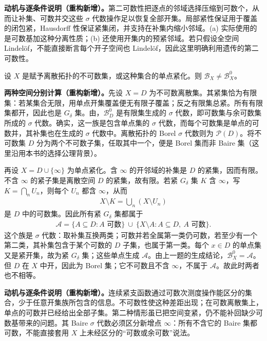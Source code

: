 \documentclass[../../main.tex]{subfiles}
\begin{document}
\begin{remark}
\textbf{动机与逐条件说明（重构新增）。}第二可数性把逐点的邻域选择压缩到可数个，从而让补集、可数并交这些 $\sigma$ 代数操作足以恢复全部开集。局部紧性保证用于覆盖的闭包紧，Hausdorff 性保证紧集闭，并支持在补集内缩小邻域。(a) 实际使用的是可数基加这种分离性质；(b) 还使用开集内的预紧邻域。若只假设全空间 Lindelöf，不能直接断言每个开子空间也 Lindelöf，因此这里明确利用遗传的第二可数性。
\end{remark}

\begin{exercise}\label{exercise:ch07-baire-borel-different}
设 $X$ 是赋予离散拓扑的不可数集，或这种集合的单点紧化。则 $\mathscr B_X\ne\mathscr B_X^0$。
\end{exercise}
\begin{solution}
\textbf{两种空间分别计算（重构新增）。}先设 $X=D$ 为不可数离散集。其紧集恰为有限集：若某集合无限，用单点开集覆盖便无有限子覆盖；反之有限集总紧。所有有限集都开，因此也是 $G_\delta$ 集。由，$\mathscr B_D^0$ 是有限集生成的 $\sigma$ 代数，即可数集与余可数集所成的 $\sigma$ 代数。确实，这一族是包含单点集的 $\sigma$ 代数，而每个可数集是单点的可数并，其补集也在生成的 $\sigma$ 代数中。离散拓扑的 Borel $\sigma$ 代数则为 $\mathscr P(D)$。将不可数集 $D$ 分为两个不可数子集，任取其中一个，便是 Borel 集而非 Baire 集（这里沿用本书的选择公理背景）。

再设 $X=D\cup\{\infty\}$ 为单点紧化。含 $\infty$ 的开邻域的补集是 $D$ 的紧集，因而有限。不含 $\infty$ 的紧子集是离散空间 $D$ 的紧集，故有限。若紧 $G_\delta$ 集 $K$ 含 $\infty$，写 $K=\bigcap_n U_n$，则每个 $U_n$ 都含 $\infty$，从而
\begin{align*}
X\setminus K=\bigcup_n(X\setminus U_n)
\end{align*}
是 $D$ 中的可数集。因此所有紧 $G_\delta$ 集都属于
\begin{align*}
\mathscr A=\{A\subseteq D:A\text{ 可数}\}
\ \cup\ \{X\setminus A:A\subseteq D,\ A\text{ 可数}\}.
\end{align*}
这个族是 $\sigma$ 代数：取补集互换两类；可数并若全属第一类仍可数，若至少有一个第二类，其补集包含于某个可数的 $D$ 子集，也属于第一类。每个 $x\in D$ 的单点集又是紧开集，故为紧 $G_\delta$ 集；这些单点生成 $\mathscr A$。由上一题的生成结论，$\mathscr B_X^0=\mathscr A$。但 $D$ 在 $X$ 中开，因此为 Borel 集；它不可数且不含 $\infty$，不属于 $\mathscr A$。故此时两者也不相等。
\end{solution}
\begin{remark}
\textbf{动机与逐条件说明（重构新增）。}连续紧支函数通过可数次测度操作能区分的集合，少于任意开集族所包含的信息。不可数性使这种差距出现；在可数离散集上，单点的可数并已经给出全部子集。第二种情形虽已把空间变紧，仍不能补回缺少可数基带来的问题。其 Baire $\sigma$ 代数必须区分新增点 $\infty$：所有不含它的 Baire 集都可数，不能直接套用 $X$ 上未经区分的“可数或余可数”说法。
\end{remark}
\end{document}

